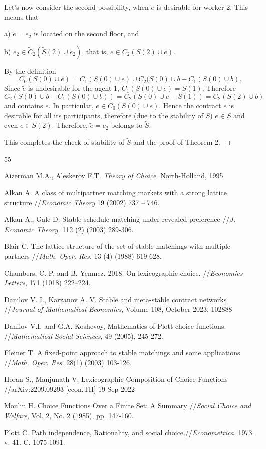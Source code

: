 \documentclass[12pt,a4paper]{article}
\begin{document}
Let's now consider the second possibility, when $\widetilde e$ is desirable for worker 2. This means that

a) $\widetilde e=e_2$ is located on the second floor, and

b) $e_2\in\widetilde C_2(\widetilde S(2)\cup e_2)$, that is, $e\in C_2(S(2)\cup e)$.

\noindent  By the definition
                      $$
C_0(S(0)\cup e)=C_1(S(0)\cup e)\cup C_2(S(0)\cup b-C_1(S(0)\cup b).
                        $$
Since $\widetilde e$ is undesirable for the agent 1, $C_1(S(0)\cup e)=S(1)$. Therefore
              $$
C_2(S(0)\cup b-C_1(S(0)\cup b))=C_2(S(0)\cup e-S(1))=C_2(S(2)\cup b)
                $$
and contains $e$. In particular, $e\in C_0(S(0)\cup e)$. Hence the contract $e$ is desirable for all its participants, therefore (due to the stability of $S$) $e\in S$ and even $e\in S(2)$. Therefore, $\widetilde e=e_2$ belongs to $\widetilde S$.

This completes the check of stability of $\widetilde S$ and the proof of Theorem 2. $\Box$\medskip



\begin{thebibliography}{55}

 Aizerman M.A., Aleskerov F.T. \emph{Theory of Choice.}
    North-Holland, 1995

 Alkan A.  A class of multipartner matching markets
with a strong lattice structure //\emph{Economic Theory} 19 (2002) 737 -- 746.

 Alkan A., Gale D. Stable schedule matching under revealed
    preference //\emph{J. Economic Theory.} 112 (2) (2003)  289-306.

 Blair C. The lattice structure of the set of stable matchings with multiple partners //\emph{Math. Oper. Res.} 13 (4) (1988) 619-628.

 Chambers, C. P. and B. Yenmez. 2018. On lexicographic choice. //\emph{Economics Letters}, 171 (1018) 222--224.


 Danilov V. I., Karzanov A. V. Stable and meta-stable contract networks //\emph{Journal of Mathematical Economics}, Volume 108, October 2023, 102888

 {Danilov V.I. and G.A. Koshevoy}, Mathematics of Plott choice
    functions. //{\em Mathematical Social Sciences}, 49 (2005), 245-272.


 Fleiner T. A fixed-point approach to stable matchings and some
    applications //\emph{Math. Oper. Res.} 28(1) (2003) 103-126.

 Horan S., Manjunath V. Lexicographic Composition of Choice Functions //arXiv:2209.09293 [econ.TH] 19 Sep 2022

 Moulin H. Choice Functions Over a Finite Set: A Summary //\emph{Social Choice and Welfare}, Vol. 2, No. 2 (1985), pp. 147-160.


 Plott C. Path independence, Rationality, and social choice.//\emph{Econometrica}. 1973. v. 41. C. 1075-1091.

\end{thebibliography}
\end{document}
